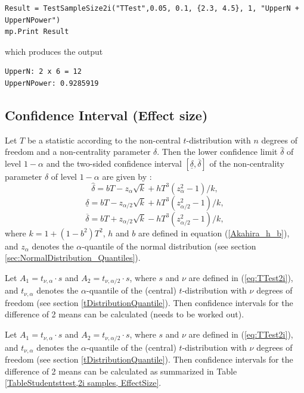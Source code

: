 \begin{lstlisting}
Result = TestSampleSize2i("TTest",0.05, 0.1, {2.3, 4.5}, 1, "UpperN + UpperNPower")
mp.Print Result
\end{lstlisting}
which produces the output

\begin{verbatim}
UpperN: 2 x 6 = 12
UpperNPower: 0.9285919
\end{verbatim}



\subsection{Confidence Interval (Effect size)}
Let $T$ be a statistic according to the non-central $t$-distribution
with $n$ degrees of freedom and a non-centrality parameter $\delta$. Then
the lower confidence limit $\widehat{\delta}$ of level $1-\alpha$ and the two-sided confidence interval $[ \underline{\delta},\overline{\delta}]$ of the
non-centrality parameter $\delta$ of level $1-\alpha$ are given by \cite{akahira_1995}:
\begin{equation}
	\widehat{\delta} = bT - z_\alpha \sqrt{k} +  h T^3 (z_\alpha^2 - 1)/k,
\end{equation} 
\begin{equation}
	\underline{\delta} = bT - z_{\alpha/2} \sqrt{k} +  h T^3 (z_{\alpha/2}^2 - 1)/k,
\end{equation} 
\begin{equation}
	\overline{\delta} = bT + z_{\alpha/2} \sqrt{k} -  h T^3 (z_{\alpha/2}^2 - 1)/k,
\end{equation} 
where $k=1+(1-b^2)T^2$, $h$ and $b$ are defined in equation (\ref{Akahira_h_b}), and $z_\alpha$ denotes the $\alpha$-quantile of the normal distribution (see section \ref{sec:NormalDistribution_Quantiles}).


Let $A_1=t_{\nu,\alpha} \cdot s$ and $A_2=t_{\nu,\alpha/2} \cdot s$, where $s$ and $\nu$ are defined in (\ref{eq:TTest2i}), and $t_{\nu,\alpha}$ denotes the $\alpha$-quantile of the (central) $t$-distribution with $\nu$ degrees of freedom (see section \ref{tDistributionQuantile}). Then confidence intervals for the difference of 2 means can be calculated (needs to be worked out).



Let $A_1=t_{\nu,\alpha} \cdot s$ and $A_2=t_{\nu,\alpha/2} \cdot s$, where $s$ and $\nu$ are defined in (\ref{eq:TTest2i}), and $t_{\nu,\alpha}$ denotes the $\alpha$-quantile of the (central) $t$-distribution with $\nu$ degrees of freedom (see section \ref{tDistributionQuantile}). Then confidence intervals for the difference of 2 means can be calculated as summarized in Table \ref{TableStudentsttest,2i samples, EffectSize}.

